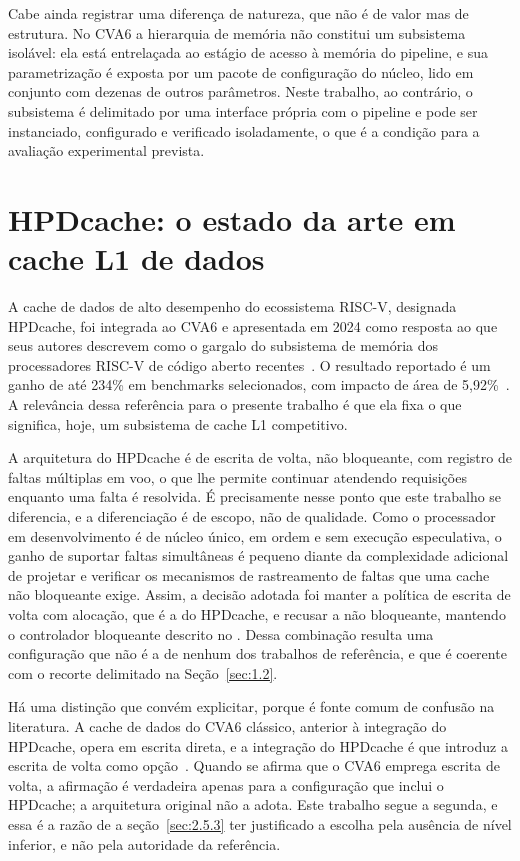 Cabe ainda registrar uma diferença de natureza, que não é de valor mas de estrutura. No CVA6 a hierarquia de memória não constitui um subsistema isolável: ela está entrelaçada ao estágio de acesso à memória do pipeline, e sua parametrização é exposta por um pacote de configuração do núcleo, lido em conjunto com dezenas de outros parâmetros. Neste trabalho, ao contrário, o subsistema é delimitado por uma interface própria com o pipeline e pode ser instanciado, configurado e verificado isoladamente, o que é a condição para a avaliação experimental prevista.

\section{HPDcache: o estado da arte em cache L1 de dados}\label{sec:3.2}

A cache de dados de alto desempenho do ecossistema RISC-V, designada HPDcache, foi integrada ao CVA6 e apresentada em 2024 como resposta ao que seus autores descrevem como o gargalo do subsistema de memória dos processadores RISC-V de código aberto recentes~\cite{million2024hpdcache}. O resultado reportado é um ganho de até 234\% em benchmarks selecionados, com impacto de área de 5,92\%~\cite{million2024hpdcache}. A relevância dessa referência para o presente trabalho é que ela fixa o que significa, hoje, um subsistema de cache L1 competitivo.

A arquitetura do HPDcache é de escrita de volta, não bloqueante, com registro de faltas múltiplas em voo, o que lhe permite continuar atendendo requisições enquanto uma falta é resolvida. É precisamente nesse ponto que este trabalho se diferencia, e a diferenciação é de escopo, não de qualidade. Como o processador em desenvolvimento é de núcleo único, em ordem e sem execução especulativa, o ganho de suportar faltas simultâneas é pequeno diante da complexidade adicional de projetar e verificar os mecanismos de rastreamento de faltas que uma cache não bloqueante exige. Assim, a decisão adotada foi manter a política de escrita de volta com alocação, que é a do HPDcache, e recusar a não bloqueante, mantendo o controlador bloqueante descrito no . Dessa combinação resulta uma configuração que não é a de nenhum dos trabalhos de referência, e que é coerente com o recorte delimitado na Seção~\ref{sec:1.2}.

Há uma distinção que convém explicitar, porque é fonte comum de confusão na literatura. A cache de dados do CVA6 clássico, anterior à integração do HPDcache, opera em escrita direta, e a integração do HPDcache é que introduz a escrita de volta como opção~\cite{million2024hpdcache}. Quando se afirma que o CVA6 emprega escrita de volta, a afirmação é verdadeira apenas para a configuração que inclui o HPDcache; a arquitetura original não a adota. Este trabalho segue a segunda, e essa é a razão de a seção~\ref{sec:2.5.3} ter justificado a escolha pela ausência de nível inferior, e não pela autoridade da referência.

